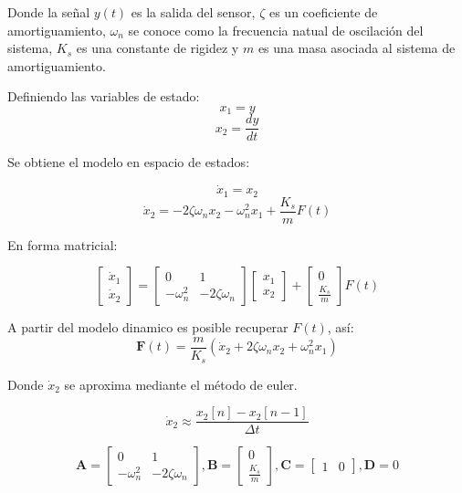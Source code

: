 \documentclass[conference]{IEEEtran}
\begin{document}
Donde la se\~nal $y(t)$ es la salida del sensor, $\zeta$ es un coeficiente de amortiguamiento, $\omega_n$ se conoce como la frecuencia natual de oscilaci\'on del sistema, ${K_s}$ es una constante de rigidez y $m$ es una masa asociada al sistema de amortiguamiento.

Definiendo las variables de estado:
\[
	x_1 = y
\]
\[
	x_2 = \frac{dy}{dt}
\]

Se obtiene el modelo en espacio de estados:

\[
	\dot{x}_1 = x_2
\]
\[
	\dot{x}_2 = -2\zeta\omega_n x_2 - \omega_n^2x_1 + \frac{K_s}{m}F(t)
\]


En forma matricial:

\begin{equation*}
	\begin{bmatrix}
		\dot{x}_1 \\
		\dot{x}_2
	\end{bmatrix}
	=
	\begin{bmatrix}
		0           & 1               \\
		-\omega_n^2 & -2\zeta\omega_n
	\end{bmatrix}
	\begin{bmatrix}
		x_1 \\
		x_2
	\end{bmatrix}
	+
	\begin{bmatrix}
		0 \\
		\frac{K_s}{m}
	\end{bmatrix}
	F(t)
\end{equation*}


A partir del modelo dinamico es posible recuperar $F(t)$, as\'i:
\begin{equation*}
	\textbf{F}(t) = \frac{m}{K_s} \left( \dot{x}_2 + 2\zeta\omega_n x_2 + \omega_n^2 x_1 \right)
\end{equation*}


Donde $\dot{x}_2$ se aproxima mediante el m\'etodo de euler.

\begin{equation*}
	\dot{x}_2 \approx \frac{x_2[n] - x_2[n-1]}{\Delta t}
\end{equation*}

\begin{equation*}
	\textbf{A} =
	\begin{bmatrix}
		0           & 1               \\
		-\omega_n^2 & -2\zeta\omega_n
	\end{bmatrix}
	, \textbf{B} =
	\begin{bmatrix}
		0 \\
		\frac{K_s}{m}
	\end{bmatrix}
	, \textbf{C} =
	\begin{bmatrix}
		1 & 0
	\end{bmatrix}
	, \textbf{D} = 0
\end{equation*}
\end{document}
